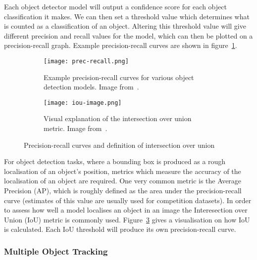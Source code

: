 \documentclass[../interim.tex]{subfiles}
\begin{document}
Each object detector model will output a confidence score for each object classification it makes. We can then set a threshold value which determines what is counted as a classification of an object. Altering this threshold value will give different precision and recall values for the model, which can then be plotted on a precision-recall graph. Example precision-recall curves are shown in figure~\ref{fig:prec-recall}.

\begin{figure}
  \centering
  \begin{subfigure}{0.48\textwidth}
    \texttt{[image: prec-recall.png]}
    \caption{Example precision-recall curves for various object detection models. Image from~\cite{yolo}.}
    \label{fig:prec-recall}
  \end{subfigure}
  \hfill
  \begin{subfigure}{0.48\textwidth}
    \texttt{[image: iou-image.png]}
    \caption{Visual explanation of the intersection over union metric. Image from~\cite{iou-image}.}
    \label{fig:iou}
  \end{subfigure}
  \caption{Precision-recall curves and definition of intersection over union}
\end{figure}

For object detection tasks, where a bounding box is produced as a rough localisation of an object's position, metrics which measure the accuracy of the localisation of an object are required. One very common metric is the Average Precision (AP), which is roughly defined as the area under the precision-recall curve (estimates of this value are usually used for competition datasets). In order to assess how well a model localises an object in an image the Interesection over Union (IoU) metric is commonly used. Figure~\ref{fig:iou} gives a visualisation on how IoU is calculated. Each IoU threshold will produce its own precision-recall curve.


\subsubsection{Multiple Object Tracking}
\end{document}
